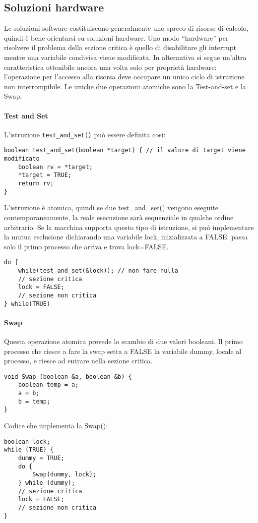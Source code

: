 \documentclass[a4paper]{article}
\begin{document}
\subsection{Soluzioni hardware}
Le soluzioni software costituiscono generalmente uno spreco di risorse di calcolo, quindi è bene orientarsi su soluzioni hardware. Uno modo ``hardware'' per risolvere il problema della sezione critica è quello di disabilitare gli interrupt mentre una variabile condivisa viene modificata. In alternativa si segue un’altra caratteristica ottenibile ancora una volta solo per proprietà hardware: l’operazione per l’accesso alla risorsa deve occupare un unico ciclo di istruzione non interrompibile. Le uniche due operazioni atomiche sono la Test-and-set e la Swap.
\paragraph{Test and Set}
L'istruzione \texttt{test\_and\_set()} può essere definita così:
\begin{verbatim}
boolean test_and_set(boolean *target) { // il valore di target viene modificato
    boolean rv = *target;
    *target = TRUE;
    return rv;
}
\end{verbatim}
L'istruzione è atomica, quindi se due test\_and\_set() vengono eseguite contemporaneamente, la reale esecuzione sarà sequenziale in qualche ordine arbitrario. Se la macchina supporta questo tipo di istruzione, si può implementare la mutua esclusione dichiarando una variabile lock, inizializzata a FALSE: passa solo il primo processo che arriva e trova lock=FALSE.
\begin{verbatim}
do {
    while(test_and_set(&lock)); // non fare nulla
    // sezione critica
    lock = FALSE;
    // sezione non critica
} while(TRUE)
\end{verbatim}

\paragraph{Swap}
Questa operazione atomica prevede lo scambio di due valori booleani. Il primo processo che riesce a fare la swap setta a FALSE la variabile dummy, locale al processo, e riesce ad entrare nella sezione critica.
\begin{verbatim}
void Swap (boolean &a, boolean &b) {
    boolean temp = a;
    a = b;
    b = temp;
}
\end{verbatim}
Codice che implementa la Swap():
\begin{verbatim}
boolean lock;
while (TRUE) {
    dummy = TRUE;
    do {
        Swap(dummy, lock);
    } while (dummy);
    // sezione critica
    lock = FALSE;
    // sezione non critica
}
\end{verbatim}
\end{document}
